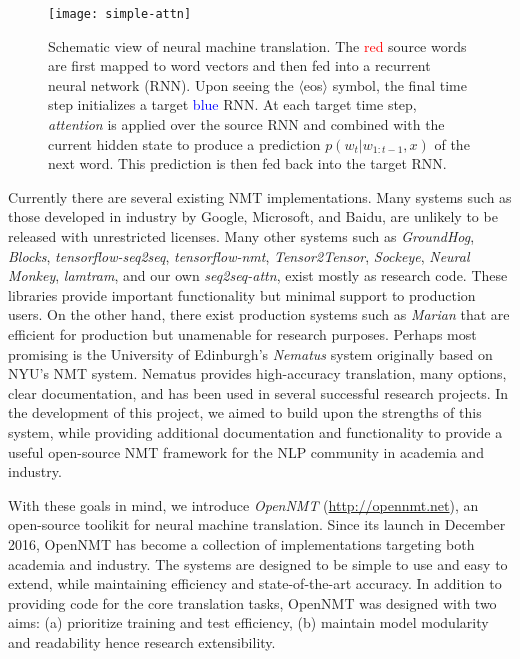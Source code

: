 \documentclass[]{article}
\begin{document}
\begin{figure}
  \centering
  \texttt{[image: simple-attn]}
  \label{fig:rnn}
  \caption{\small Schematic view of neural machine translation. The \textcolor{red}{red} source words are first mapped to word vectors and then fed into a recurrent neural network (RNN). Upon seeing the $\langle$eos$\rangle$ symbol, the final time step initializes a target \textcolor{blue}{blue} RNN. At each target time step, \textit{attention} is applied over the source RNN and combined with the current hidden state to produce a prediction $p(w_t| w_{1: t-1}, x)$ of the next word. This prediction is then fed back into the target RNN.}
\end{figure}


Currently there are several existing NMT implementations. Many systems
such as those developed in industry by Google, Microsoft, and Baidu, are unlikely to be released with unrestricted
licenses. Many other systems such as \textit{GroundHog},
\textit{Blocks}, \textit{tensorflow-seq2seq}, \textit{tensorflow-nmt}, \textit{Tensor2Tensor}, \textit{Sockeye}, \textit{Neural Monkey}, \textit{lamtram}, and
our own \textit{seq2seq-attn}, exist mostly as research code. These
libraries provide important functionality but minimal support to
production users. On the other hand, there exist production systems such as \textit{Marian} that are efficient for production but unamenable for research purposes. Perhaps most promising is the University of
Edinburgh's \textit{Nematus} system originally based on NYU's NMT
system. Nematus provides high-accuracy translation, many options,
clear documentation, and has been used in several successful research
projects. In the development of this project, we aimed to build upon
the strengths of this system, while providing additional documentation
and functionality to provide a useful open-source NMT framework for
the NLP community in academia and industry.

With these goals in mind, we introduce \textit{OpenNMT}
(\url{http://opennmt.net}), an open-source toolikit for neural machine translation. Since its launch in December 2016, OpenNMT has become a collection of implementations targeting both academia and industry. The systems are designed to be simple to use and easy to extend, while maintaining efficiency and state-of-the-art accuracy. In
addition to providing code for the core translation tasks, OpenNMT was
designed with two aims: (a) prioritize training and test
efficiency, (b) maintain model modularity and readability hence research extensibility.
\end{document}
